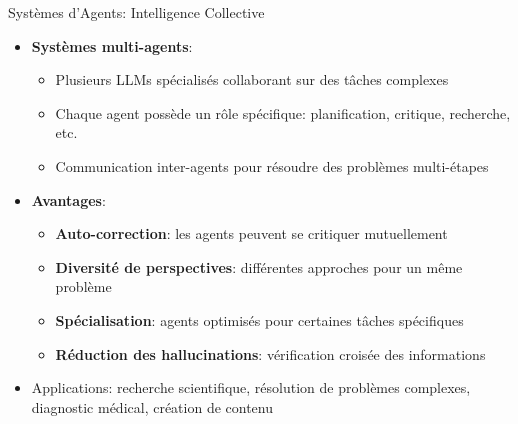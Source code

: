 \documentclass[aspectratio=169,11pt]{beamer}
\begin{document}
\begin{frame}{Systèmes d'Agents: Intelligence Collective}
    \begin{itemize}
        \item \textbf{Systèmes multi-agents}:
        \begin{itemize}
            \item Plusieurs LLMs spécialisés collaborant sur des tâches complexes
            \item Chaque agent possède un rôle spécifique: planification, critique, recherche, etc.
            \item Communication inter-agents pour résoudre des problèmes multi-étapes
        \end{itemize}
        \vspace{0.3cm}
        \item \textbf{Avantages}:
        \begin{itemize}
            \item \textbf{Auto-correction}: les agents peuvent se critiquer mutuellement 
            \item \textbf{Diversité de perspectives}: différentes approches pour un même problème
            \item \textbf{Spécialisation}: agents optimisés pour certaines tâches spécifiques
            \item \textbf{Réduction des hallucinations}: vérification croisée des informations
        \end{itemize}
        \vspace{0.3cm}
        \item Applications: recherche scientifique, résolution de problèmes complexes, diagnostic médical, création de contenu
    \end{itemize}
\end{frame}
\end{document}
